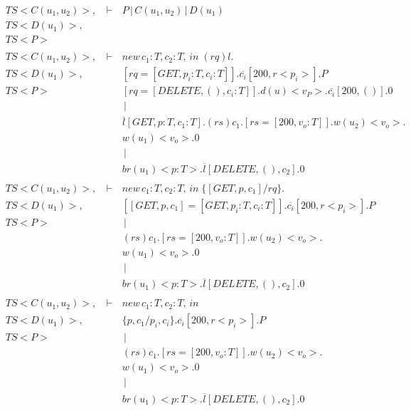 \setcounter{equation}{0}
\begin{eqnarray*}
 \ TS<C(u_1,u_2)>,\, &\vdash\,&  P\,|\,C(u_1,u_2)\,|\,D(u_1) \\
 \ TS<D(u_1)>,   &        &          \\
\  TS<P>   &        &          \\
 \               &        &          \\
 \ TS<C(u_1,u_2)>, &\vdash\,& new\,c_1:T,c_2:T,\,in\; (rq)l. \\
 \ TS<D(u_1)>,     &        & [rq = [GET,p_i:T,c_i:T]].\overline{c_i}[200,r<p_i>].P         \\
 \ TS<P>           &        & [rq = [DELETE,(),c_i:T]].d(u)<v_{P}>.\overline{c_i}[200,()].0         \\
 \               &        &    \,|\,      \\
 \               &        &  \overline{l}[GET,p:T,c_1:T].(rs)c_1.[rs = [200,v_o:T]].w(u_2)<v_o>. \\
 \               &        & w(u_1)<v_o>.0        \\
 \               &        &    \,|\,      \\
 \               &        &  br(u_1)<p:T>.\overline{l}[DELETE,(),c_2].0 \\
 \               &        &          \\
 \ TS<C(u_1,u_2)>, &\vdash\,& new\,c_1:T,c_2:T,\,in\; \{[GET,p,c_1]/rq\}. \\
 \ TS<D(u_1)>,     &        & [[GET,p,c_1] = [GET,p_i:T,c_i:T]].\overline{c_i}[200,r<p_i>].P         \\
 \ TS<P>              &        &    \,|\,      \\
 \               &        &  (rs)c_1.[rs = [200,v_o:T]].w(u_2)<v_o>. \\
 \               &        & w(u_1)<v_o>.0        \\
 \               &        &    \,|\,      \\
 \               &        &  br(u_1)<p:T>.\overline{l}[DELETE,(),c_2].0 \\
 \               &        &          \\
 \ TS<C(u_1,u_2)>, &\vdash\,& new\,c_1:T,c_2:T,\,in\; \\
 \ TS<D(u_1)>,     &        & \{ p,c_1 / p_i, c_i \}.\overline{c_i}[200,r<p_i>].P         \\
 \ TS<P>           &        &    \,|\,      \\
 \               &        &  (rs)c_1.[rs = [200,v_o:T]].w(u_2)<v_o>. \\
 \               &        & w(u_1)<v_o>.0        \\
 \               &        &    \,|\,      \\
 \               &        &  br(u_1)<p:T>.\overline{l}[DELETE,(),c_2].0 \\
 \               &        &          \\
\end{eqnarray*}
